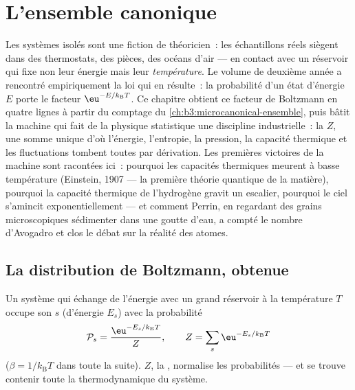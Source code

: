 \chapter{L'ensemble canonique}\label{ch:b3:canonical-ensemble}

Les systèmes isolés sont une fiction de théoricien~: les échantillons
réels siègent dans des thermostats, des pièces, des océans d'air ---
en contact avec un réservoir qui fixe non leur énergie mais leur
\emph{température}. Le volume de deuxième année a rencontré
empiriquement la loi qui en résulte~: la probabilité d'un état
d'énergie $E$ porte le facteur $\eu^{-E/k_{\text{B}}T}$. Ce chapitre
obtient ce facteur de Boltzmann en quatre lignes à partir du comptage
du \cref{ch:b3:microcanonical-ensemble}, puis bâtit la machine qui
fait de la physique statistique une discipline industrielle~: la
\emph{} $Z$, une somme unique d'où l'énergie,
l'entropie, la pression, la capacité thermique et les fluctuations
tombent toutes par dérivation. Les premières victoires de la machine
sont racontées ici~: pourquoi les capacités thermiques meurent à basse
température (Einstein, 1907 --- la première théorie quantique de la
matière), pourquoi la capacité thermique de l'hydrogène gravit un
escalier, pourquoi le ciel s'amincit exponentiellement --- et comment
Perrin, en regardant des grains microscopiques sédimenter dans une
goutte d'eau, a compté le nombre d'Avogadro et clos le débat sur la
réalité des atomes.

\section{La distribution de Boltzmann, obtenue}

\begin{theorem}\label{thm:b3:canonical-ensemble:boltzmann}
Un système qui échange de l'énergie avec un grand réservoir à la
température $T$ occupe son  $s$ (d'énergie $E_s$) avec la
probabilité
\[
\mathcal P_s = \frac{\eu^{-E_s/k_{\text{B}}T}}{Z} , \qquad
Z = \sum_s \eu^{-E_s/k_{\text{B}}T}
\]
($\beta = 1/k_{\text{B}}T$ dans toute la suite). $Z$, la
\emph{}, normalise les probabilités --- et se
trouve contenir toute la thermodynamique du système.
\end{theorem}

